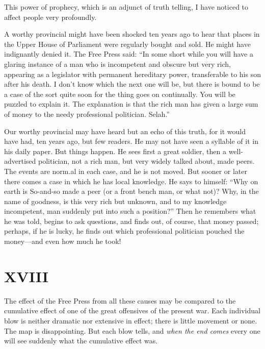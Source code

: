 \documentclass{book}
\begin{document}
This power of prophecy, which is an adjunct of truth telling, I have noticed to affect people very profoundly.

A worthy provincial might have been shocked ten years ago to hear that places in the Upper House of Parliament were regularly bought and sold. He might have indignantly denied it. The Free Press said: “In some short while you will have a glaring instance of a man who is incompetent and obscure but very rich, appearing as a legislator with permanent hereditary power, transferable to his son after his death. I don’t know which the next one will be, but there is bound to be a case of the sort quite soon for the thing goes on continually. You will be puzzled to explain it. The explanation is that the rich man has given a large sum of money to the needy professional politician. Selah.”

Our worthy provincial may have heard but an echo of this truth, for it would have had, ten years ago, but few readers. He may not have seen a syllable of it in his daily paper. But things happen. He sees first a great soldier, then a well-advertised politician, not a rich man, but very widely talked about, made peers. The events are norm.al in each case, and he is not moved. But sooner or later there comes a case in which he has local knowledge. He says to himself: “Why on earth is So-and-so made a peer (or a front bench man, or what not)? Why, in the name of goodness, is this very rich but unknown, and to my knowledge incompetent, man suddenly put into such a position?” Then he remembers what he was told, begins to ask questions, and finds out, of course, that money passed; perhaps, if he is lucky, he finds out which professional politician pouched the money—and even how much he took!

\chapter*{XVIII}
\label{chapter-19}
The effect of the Free Press from all these causes may be compared to the cumulative effect of one of the great offensives of the present war. Each individual blow is neither dramatic nor extensive in effect; there is little movement or none. The map is disappointing. But each blow tells, and \emph{when the end comes} every one will see suddenly what the cumulative effect was.
\end{document}
